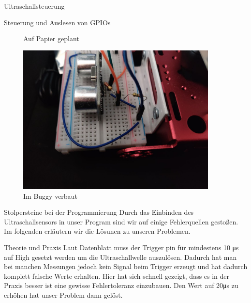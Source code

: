 \documentclass[12pt]{report}
\begin{document}
\begin{section}{Ultraschallsteuerung}
\begin{subsection}{Steuerung und Auslesen von GPIOs}
\begin{figure}[H]
\begin{minipage}{0.49\textwidth}
                \caption{Auf Papier geplant}
            \end{minipage}
            \centering
            \begin{minipage}{0.49\textwidth}
                \centering
                \includegraphics[width=0.9\textwidth]{lernportfolio_assets/UltraschallsensorSchaltplanImBuggyVerbaut.jpg}
                \caption{Im Buggy verbaut}
            \end{minipage}
        \end{figure}

    \end{subsection}

    \begin{subsection}{Stolpersteine bei der Programmierung}
        Durch das Einbinden des Ultraschallsensors in unser Program sind wir auf
        einige Fehlerquellen gestoßen. Im folgenden erläutern wir die Lösunen zu
        unseren Problemen.
        \begin{paragraphwithnewline}{Theorie und Praxis}
            Laut Datenblatt muss der Trigger pin für mindestens 10 \si{\micro\second}
            auf High gesetzt werden um die Ultraschallwelle auszulösen. Dadurch
            hat man bei manchen Messungen jedoch kein Signal beim Trigger erzeugt
            und hat dadurch komplett falsche Werte erhalten. Hier hat sich
            schnell gezeigt, dass es in der Praxis besser ist eine gewisse Fehlertoleranz
            einzubauen. Den Wert auf 20\si{\micro\second} zu erhöhen hat unser
            Problem dann gelöst.
        \end{paragraphwithnewline}


\end{subsection}
\end{section}
\end{document}
